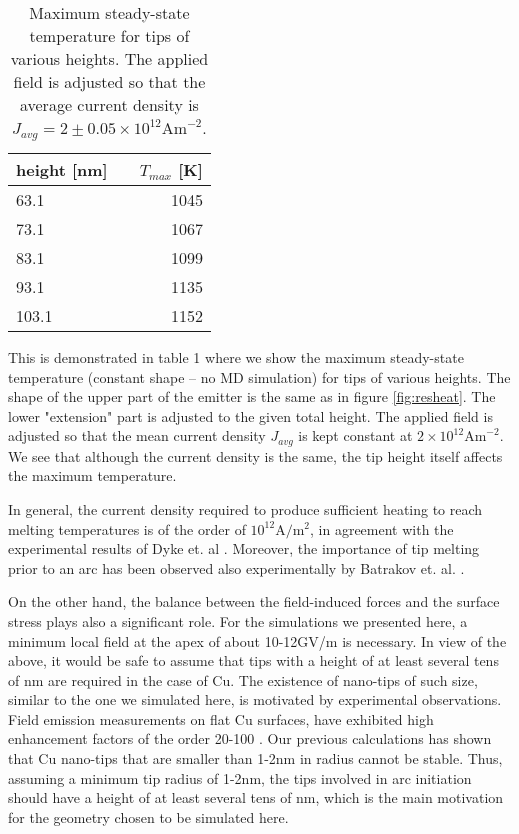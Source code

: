 \documentclass[%
 aps,
 prb,%
 amsmath,amssymb,
reprint,%
superscriptaddress,
]{revtex4-1}
\begin{document}
\begin{table}[h]
	\centering
	\caption{Maximum steady-state temperature for tips of various heights. The applied field is adjusted so that the average current density is $J_{avg} = 2 \pm 0.05 \times 10^{12}\textrm{Am}^{-2}$.}
	\label{tab:tab1}	
	\begin{tabular*}{0.5\linewidth}{l c r}
		\hline \hline 
		height [nm] & & $T_{max}$ [K]	\\
		\hline 
		63.1 & & 1045 \\
		73.1 & & 1067 \\
		83.1 & & 1099 \\
		93.1 & & 1135 \\
		103.1 & &  1152 \\
		\hline
	\end{tabular*}
\end{table} 

This is demonstrated in table 1 where we show the maximum steady-state temperature (constant shape -- no MD simulation) for tips of  various heights. The shape of the upper part of the emitter is the same as in figure \ref{fig:resheat}. The lower "extension" part is adjusted to the given total height. The applied field is adjusted so that the mean current density $J_{avg}$ is kept constant at $2 \times 10^{12}\textrm{Am}^{-2}$. 
We see that although the current density is the same, the tip height itself affects the maximum temperature.

In general, the current density required to produce sufficient heating to reach melting temperatures is of the order of $10^{12} \textrm{A}/\textrm{m}^2$, in agreement with the experimental results of Dyke et. al \cite{Dyke1953I,Dyke1953Arc}. Moreover, the importance of tip melting prior to an arc has been observed also experimentally by Batrakov et. al. \cite{Batrakov_melt}.

On the other hand, the balance between the field-induced forces and the surface stress plays also a significant role.
For the simulations we presented here, a minimum local field at the apex of about 10-12GV/m is necessary.
In view of the above, it would be safe to assume that tips with a height of at least several tens of nm are required in the case of Cu.
The existence of nano-tips of such size, similar to the one we simulated here, is motivated by experimental observations.
Field emission measurements on flat Cu surfaces, have exhibited high enhancement factors of the order 20-100 \cite{CERN2004}. 
Our previous calculations \cite{Veske2016, janssonKMC} has shown that Cu nano-tips that are smaller than 1-2nm in radius cannot be stable. 
Thus, assuming a minimum tip radius of 1-2nm, the tips involved in arc initiation should have a height of at least several tens of nm, which is the main motivation for the geometry chosen to be simulated here.
\end{document}
